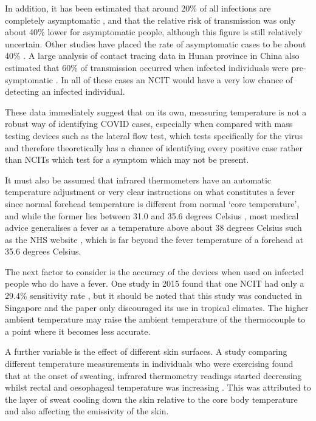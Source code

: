 \documentclass[11pt]{report}
\begin{document}
In addition, it has been estimated that around 20\% of all infections are completely asymptomatic \cite{ir8}, and that the relative risk of transmission was only about 40\% lower for asymptomatic people, although this figure is still relatively uncertain. Other studies have placed the rate of asymptomatic cases to be about 40\% \cite{ir9}. A large analysis of contact tracing data in Hunan province in China also estimated that 60\% of transmission occurred when infected individuals were pre-symptomatic \cite{ir10}. In all of these cases an NCIT would have a very low chance of detecting an infected individual.

These data immediately suggest that on its own, measuring temperature is not a robust way of identifying COVID cases, especially when compared with mass testing devices such as the lateral flow test, which tests specifically for the virus and therefore theoretically has a chance of identifying every positive case rather than NCITs which test for a symptom which may not be present.

It must also be assumed that infrared thermometers have an automatic temperature adjustment or very clear instructions on what constitutes a fever since normal forehead temperature is different from normal ‘core temperature’, and while the former lies between 31.0 and 35.6 degrees Celsius \cite{ir11}, most medical advice generalises a fever as a temperature above about 38 degrees Celsius such as the NHS website \cite{ir12}, which is far beyond the fever temperature of a forehead at 35.6 degrees Celsius.

The next factor to consider is the accuracy of the devices when used on infected people who do have a fever. One study in 2015 found that one NCIT had only a 29.4\% sensitivity rate \cite{ir13}, but it should be noted that this study was conducted in Singapore and the paper only discouraged its use in tropical climates. The higher ambient temperature may raise the ambient temperature of the thermocouple to a point where it becomes less accurate.

A further variable is the effect of different skin surfaces. A study comparing different temperature measurements in individuals who were exercising found that at the onset of sweating, infrared thermometry readings started decreasing whilst rectal and oesophageal temperature was increasing \cite{ir14}. This was attributed to the layer of sweat cooling down the skin relative to the core body temperature and also affecting the emissivity of the skin.
\end{document}
